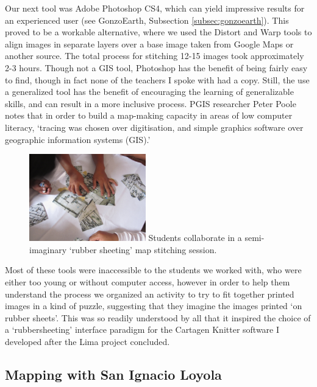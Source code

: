 \documentclass[11pt]{report}
\begin{document}
Our next tool was Adobe Photoshop CS4, which can yield impressive results for an experienced user (see GonzoEarth, Subsection \ref{subsec:gonzoearth}). This proved to be a workable alternative, where we used the Distort and Warp tools to align images in separate layers over a base image taken from Google Maps or another source. The total process for stitching 12-15 images took approximately 2-3 hours. Though not a GIS tool, Photoshop has the benefit of being fairly easy to find, though in fact none of the teachers I spoke with had a copy. Still, the use a generalized tool has the benefit of encouraging the learning of generalizable skills, and can result in a more inclusive process. PGIS researcher Peter Poole notes that in order to build a map-making capacity in areas of low computer literacy, `tracing was chosen over digitisation, and simple graphics software over geographic information systems (GIS).' \cite{poole2006there}

\begin{figure}
	\begin{flushright}
		\includegraphics[width=0.45\textwidth]{images/juan-pablo-rubbersheeting.jpg}
		Students collaborate in a semi-imaginary `rubber sheeting' map stitching session. 
	\end{flushright}
\end{figure}

Most of these tools were inaccessible to the students we worked with, who were either too young or without computer access, however in order to help them understand the process we organized an activity to try to fit together printed images in a kind of puzzle, suggesting that they imagine the images printed `on rubber sheets'. This was so readily understood by all that it inspired the choice of a `rubbersheeting' interface paradigm for the Cartagen Knitter software I developed after the Lima project concluded. 

\subsection{Mapping with San Ignacio Loyola}
\end{document}
